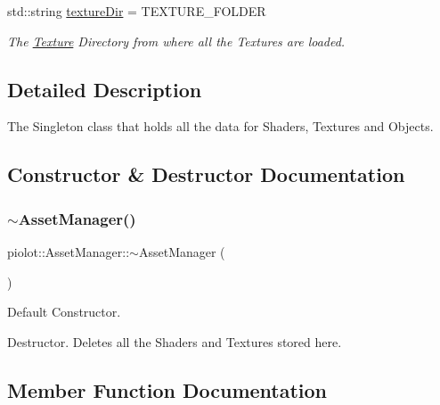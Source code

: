 \begin{DoxyCompactItemize}
\mbox{\label{classpiolot_1_1_asset_manager_a001707738b5a8e9da3fd5bfd3557392a}} 
std\+::string \mbox{\hyperlink{classpiolot_1_1_asset_manager_a001707738b5a8e9da3fd5bfd3557392a}{texture\+Dir}} = T\+E\+X\+T\+U\+R\+E\+\_\+\+F\+O\+L\+D\+ER
\begin{DoxyCompactList}\small\item\em The \mbox{\hyperlink{classpiolot_1_1_texture}{Texture}} Directory from where all the Textures are loaded. \end{DoxyCompactList}\end{DoxyCompactItemize}


\subsection{Detailed Description}
The Singleton class that holds all the data for Shaders, Textures and Objects. 

\subsection{Constructor \& Destructor Documentation}
\mbox{\label{classpiolot_1_1_asset_manager_a49967e4909436ff8ebaeadf08db4ebc7}} 
\subsubsection{\texorpdfstring{$\sim$\+Asset\+Manager()}{~AssetManager()}}
{\footnotesize\ttfamily piolot\+::\+Asset\+Manager\+::$\sim$\+Asset\+Manager (\begin{DoxyParamCaption}{ }\end{DoxyParamCaption})\hspace{0.3cm}{\ttfamily [inline]}}



Default Constructor. 

Destructor. Deletes all the Shaders and Textures stored here. 

\subsection{Member Function Documentation}
\mbox{\label{classpiolot_1_1_asset_manager_abfad75fa1cde6d1ecd77fbdf297a80b0}} 

